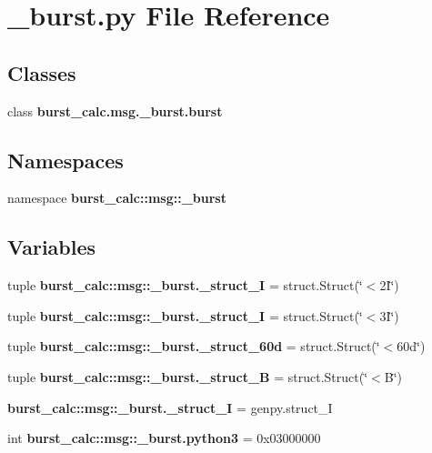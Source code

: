 \section{\-\_\-burst.\-py \-File \-Reference}
\label{__burst_8py}
\subsection*{\-Classes}
\begin{DoxyCompactItemize}
\item 
class {\bf burst\-\_\-calc.\-msg.\-\_\-burst.\-burst}
\end{DoxyCompactItemize}
\subsection*{\-Namespaces}
\begin{DoxyCompactItemize}
\item 
namespace {\bf burst\-\_\-calc\-::msg\-::\-\_\-burst}
\end{DoxyCompactItemize}
\subsection*{\-Variables}
\begin{DoxyCompactItemize}
\item 
tuple {\bf burst\-\_\-calc\-::msg\-::\-\_\-burst.\-\_\-struct\-\_\-I} = struct.\-Struct(\char`\"{}$<$2\-I\char`\"{})
\item 
tuple {\bf burst\-\_\-calc\-::msg\-::\-\_\-burst.\-\_\-struct\-\_\-I} = struct.\-Struct(\char`\"{}$<$3\-I\char`\"{})
\item 
tuple {\bf burst\-\_\-calc\-::msg\-::\-\_\-burst.\-\_\-struct\-\_\-60d} = struct.\-Struct(\char`\"{}$<$60d\char`\"{})
\item 
tuple {\bf burst\-\_\-calc\-::msg\-::\-\_\-burst.\-\_\-struct\-\_\-\-B} = struct.\-Struct(\char`\"{}$<$\-B\char`\"{})
\item 
{\bf burst\-\_\-calc\-::msg\-::\-\_\-burst.\-\_\-struct\-\_\-\-I} = genpy.\-struct\-\_\-\-I
\item 
int {\bf burst\-\_\-calc\-::msg\-::\-\_\-burst.\-python3} = 0x03000000
\end{DoxyCompactItemize}
